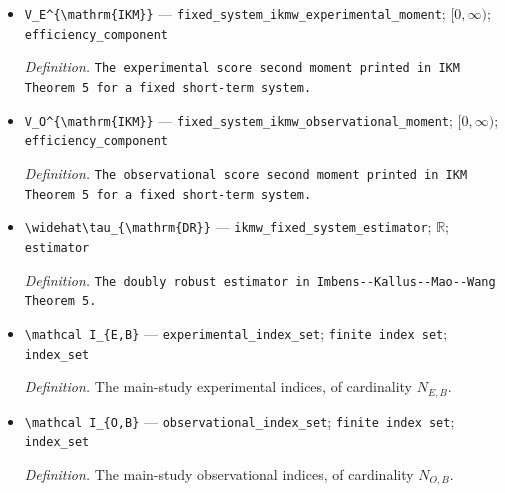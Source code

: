 \documentclass{article}
\begin{document}
\begin{itemize}
  \par\smallskip\noindent\emph{Definition.} \texttt{The strong selection-\allowbreak{}bridge rate in the cited fixed-\allowbreak{}design result.}
  \item \texttt{V\_\allowbreak{}E\textasciicircum{}\{\textbackslash{}\allowbreak{}mathrm\{IKM\}\allowbreak{}\}\allowbreak{}} --- \texttt{fixed\_\allowbreak{}system\_\allowbreak{}ikmw\_\allowbreak{}experimental\_\allowbreak{}moment}; \([0,\infty)\); \texttt{efficiency\_\allowbreak{}component}
  \par\smallskip\noindent\emph{Definition.} \texttt{The experimental score second moment printed in IKM Theorem 5 for a fixed short-\allowbreak{}term system.}
  \item \texttt{V\_\allowbreak{}O\textasciicircum{}\{\textbackslash{}\allowbreak{}mathrm\{IKM\}\allowbreak{}\}\allowbreak{}} --- \texttt{fixed\_\allowbreak{}system\_\allowbreak{}ikmw\_\allowbreak{}observational\_\allowbreak{}moment}; \([0,\infty)\); \texttt{efficiency\_\allowbreak{}component}
  \par\smallskip\noindent\emph{Definition.} \texttt{The observational score second moment printed in IKM Theorem 5 for a fixed short-\allowbreak{}term system.}
  \item \texttt{\textbackslash{}\allowbreak{}widehat\textbackslash{}\allowbreak{}tau\_\allowbreak{}\{\textbackslash{}\allowbreak{}mathrm\{DR\}\allowbreak{}\}\allowbreak{}} --- \texttt{ikmw\_\allowbreak{}fixed\_\allowbreak{}system\_\allowbreak{}estimator}; \(\mathbb R\); \texttt{estimator}
  \par\smallskip\noindent\emph{Definition.} \texttt{The doubly robust estimator in Imbens-\allowbreak{}-\allowbreak{}Kallus-\allowbreak{}-\allowbreak{}Mao-\allowbreak{}-\allowbreak{}Wang Theorem 5.}
  \item \texttt{\textbackslash{}\allowbreak{}mathcal I\_\allowbreak{}\{E,\allowbreak{}B\}\allowbreak{}} --- \texttt{experimental\_\allowbreak{}index\_\allowbreak{}set}; \texttt{finite index set}; \texttt{index\_\allowbreak{}set}
  \par\smallskip\noindent\emph{Definition.} The main-study experimental indices, of cardinality \(N_{E,B}\).
  \item \texttt{\textbackslash{}\allowbreak{}mathcal I\_\allowbreak{}\{O,\allowbreak{}B\}\allowbreak{}} --- \texttt{observational\_\allowbreak{}index\_\allowbreak{}set}; \texttt{finite index set}; \texttt{index\_\allowbreak{}set}
  \par\smallskip\noindent\emph{Definition.} The main-study observational indices, of cardinality \(N_{O,B}\).

\end{itemize}
\end{document}
